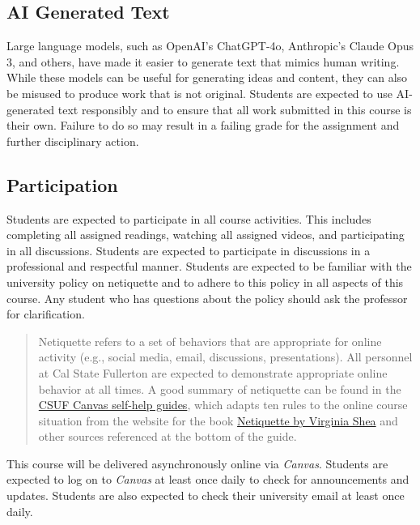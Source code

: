 \documentclass[11pt, letterpaper]{article}
\begin{document}
\subsection*{AI Generated Text} 
Large language models, such as OpenAI's ChatGPT-4o, Anthropic's Claude Opus 3, and others, have made it easier to generate text that mimics human writing. While these models can be useful for generating ideas and content, they can also be misused to produce work that is not original. Students are expected to use AI-generated text responsibly and to ensure that all work submitted in this course is their own. Failure to do so may result in a failing grade for the assignment and further disciplinary action.

\subsection*{Participation}

Students are expected to participate in all course activities. This includes completing all assigned readings, watching all assigned videos, and participating in all discussions. Students are expected to participate in discussions in a professional and respectful manner. Students are expected to be familiar with the university policy on netiquette and to adhere to this policy in all aspects of this course. Any student who has questions about the policy should ask the professor for clarification. 

\begin{quote}Netiquette refers to a set of behaviors that are appropriate for online activity (e.g., social media, email, discussions, presentations). All personnel at Cal State Fullerton are expected to demonstrate appropriate online behavior at all times. A good summary of netiquette can be found in the \href{https://canvashelp.fullerton.edu/m/Student/l/1336786-student-what-is-netiquette}{CSUF Canvas self-help guides}, which adapts ten rules to the online course situation from the website for the book \href{http://www.albion.com/netiquette/corerules.html}{Netiquette by Virginia Shea} and other sources referenced at the bottom of the guide.\end{quote}

\noindent This course will be delivered asynchronously online via \emph{Canvas}. Students are expected to log on to \emph{Canvas} at least once daily to check for announcements and updates. Students are also expected to check their university email at least once daily.
\end{document}
